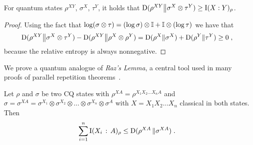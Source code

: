 \begin{proposition}
\label{prop:divergence_gibbs_inequality}
	For quantum states $\rho^{XY}$, $\sigma^X$, $\tau^Y$, it holds that $\mathrm{D}(\rho^{XY} \big \| \sigma^X \otimes \tau^Y) \geq \mathrm{I}(X : Y)_\rho$.
\end{proposition}
\begin{proof}
	Using the fact that $\log (\sigma \otimes \tau) = (\log \sigma)\otimes \mathbb{I} + \mathbb{I} \otimes (\log \tau)$ we have that
	\[
	\mathrm{D}(\rho^{XY} \big \| \sigma^X \otimes \tau^Y) - \mathrm{D}(\rho^{XY} \big \| \rho^X \otimes \rho^Y) = \mathrm{D}(\rho^X \| \sigma^X) + \mathrm{D}(\rho^Y \| \tau^Y) \geq 0\;,
	\]
	because the relative entropy is always nonnegative.
\end{proof}

We prove a quantum analogue of \emph{Raz's Lemma}, a central tool used in many proofs of parallel repetition theorems~\cite{raz1998parallel, Hol09,barak2009strong}. 

\begin{lemma}
\label{lem:quantum_raz}
Let $\rho$ and $\sigma$ be two CQ states with  $\rho^{XA}= \rho^{X_1 X_2 \ldots X_n A}$ and $\sigma= \sigma^{XA}= \sigma^{X_1}\otimes \sigma^{X_2}\otimes \ldots \otimes \sigma^{X_n} \otimes \sigma^A$ with $X=X_1 X_2 \ldots X_n$ classical in both states. Then
\begin{equation}\label{eqn:Raz_lemma1} \sum_{i=1}^n \mathrm{I}(X_i \, :\, A)_\rho \leq \mathrm{D}(\rho^{XA} \, \| \sigma^{XA})\;. \end{equation}
\end{lemma}

